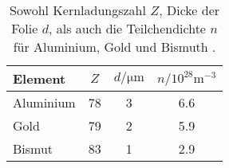 \begin{table}
\centering 
   \caption{Sowohl Kernladungszahl $Z$, Dicke der Folie $d$, als auch die Teilchendichte $n$ für Aluminium, Gold und Bismuth \cite{Elemente16}.} 
   \label{tab:zWerte}
    \begin{tabular}{lS[table-format=2.0]S[table-format=1.0]S[table-format=1.1]}
        \toprule
        {Element} & {$Z$} & {$d/\si{\micro\metre}$} & {$n/10^{28}\si{\metre^{-3}}$} \\
        \midrule
        {Aluminium} & 78 & 3 & 6.6  \\
        {Gold} & 79 & 2 & 5.9  \\
        {Bismut} & 83 & 1 & 2.9  \\
        \bottomrule
    \end{tabular}
\end{table}